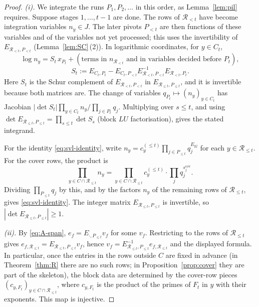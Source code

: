 \begin{proof}
\emph{(i).} We integrate the runs $P_1,P_2,\dots$ in this order, as Lemma~\ref{lem:pil} requires. Suppose stages
$1,\dots,t-1$ are done. The rows of $\mathcal R_{<t}$ have become integration variables $n_y\in J$. The later pivots
$P_{<t}$ are then functions of these variables and of the variables not yet processed; this uses the invertibility of
$E_{\mathcal R_{<t},P_{<t}}$ (Lemma~\ref{lem:SC}\,(2)). In logarithmic coordinates, for $y\in C_t$,
\[
  \log n_y=S_t\,x_{P_t}+(\text{terms in }n_{\mathcal R_{<t}}\text{ and in variables decided before }P_t),
\]
\[
  S_t:=E_{C_t,P_t}-E_{C_t,P_{<t}}E_{\mathcal R_{<t},P_{<t}}^{-1}E_{\mathcal R_{<t},P_t}.
\]
Here $S_t$ is the Schur complement of $E_{\mathcal R_{<t},P_{<t}}$ in $E_{\mathcal R_{\le t},P_{\le t}}$, and it is
invertible because both matrices are. The change of variables $q_{P_t}\mapsto(n_y)_{y\in C_t}$ has Jacobian
$|\det S_t|\prod_{y\in C_t}n_y/\prod_{j\in P_t}q_j$. Multiplying over $s\le t$, and using
$\det E_{\mathcal R_{\le t},P_{\le t}}=\prod_{s\le t}\det S_s$ (block $LU$ factorisation), gives the stated integrand.

For the identity \eqref{eq:svl-identity}, write $n_y=c_y^{(\le t)}\prod_{j\in P_{\le t}}q_j^{E_{yj}}$ for each
$y\in\mathcal R_{\le t}$. For the cover rows, the product is
\[
  \prod_{y\in C\cap\mathcal R_{\le t}}n_y=\prod_{y\in C\cap\mathcal R_{\le t}}c_y^{(\le t)}\cdot\prod_jq_j^{s_j^{\mathrm{cov}}} .
\]
Dividing $\prod_{P_{\le t}}q_j$ by this, and by the factors $n_y$ of the remaining rows of $\mathcal R_{\le t}$, gives
\eqref{eq:svl-identity}. The integer matrix $E_{\mathcal R_{\le t},P_{\le t}}$ is invertible, so
$|\det E_{\mathcal R_{\le t},P_{\le t}}|\ge1$.

\emph{(ii).} By \eqref{eq:A-span}, $e_f=E_{\cdot,P_{\le t}}v_f$ for some $v_f$. Restricting to the rows of
$\mathcal R_{\le t}$ gives $e_{f,\mathcal R_{\le t}}=E_{\mathcal R_{\le t},P_{\le t}}v_f$, hence
$v_f=E_{\mathcal R_{\le t},P_{\le t}}^{-1}e_{f,\mathcal R_{\le t}}$ and the displayed formula. In particular, once the
entries in the rows outside $C$ are fixed in advance (in Theorem~\ref{thm:R} there are no such rows; in
Proposition~\ref{prop:cover} they are part of the skeleton), the block data are determined by the cover-row pieces
$(c_{y,F_t})_{y\in C\cap\mathcal R_{\le t}}$, where $c_{y,F_t}$ is the product of the primes of $F_t$ in $y$ with their
exponents. This map is injective.


\end{proof}
